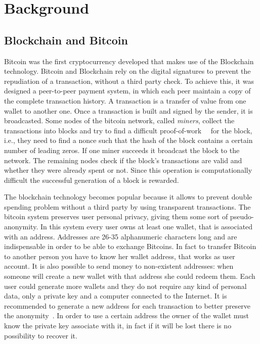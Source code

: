 \section{Background} \label{background}
\subsection{Blockchain and Bitcoin}
Bitcoin was the first cryptocurrency developed that makes use of the
Blockchain technology. Bitcoin and Blockchain rely on the digital
signatures to prevent the repudiation of a transaction, without a third
party check.
To achieve this, it was designed a peer-to-peer payment system,
in which each peer maintain a copy of the complete transaction history.
A transaction is a transfer of value from one wallet to another one.
Once a transaction is built and signed by the sender, it is broadcasted.
Some nodes of the bitcoin network, called \textit{miners}, collect the
transactions into blocks and try to find a difficult
proof-of-work~\cite{pricing}~\cite{hashcash} for the
block, i.e., they need to find a nonce such that the hash of the block
contains a certain number of leading zeros.
If one miner succeeds it broadcast the block to the network.
The remaining nodes check if the block's transactions are valid and
whether they were already spent or not.
Since this operation is computationally difficult the successful
generation of a block is rewarded.

The blockchain technology becomes popular because it allows
to prevent double spending problem without a third party by using
transparent transactions.
The bitcoin system preserves user personal privacy, giving them some
sort of pseudo-anonymity.
In this system every user owns at least one wallet, that is associated
with an address. Addresses are 26-35 alphanumeric characters long and
are indispensable in order to be able to exchange Bitcoins.
In fact to transfer Bitcoin to another person you have to know her
wallet address, that works as user account.
It is also possible to send money to non-existent addresses: when
someone will create a new wallet with that address she could redeem
them.
Each user could generate more wallets and they do not require any kind
of personal data, only a private key and a computer connected to the Internet.
It is recommended to generate a new address for each transaction
to better preserve the anonymity~\cite{satoshi}.
In order to use a certain address the owner of the wallet must know
the private key associate with it, in fact if it
will be lost there is no possibility to recover it.


